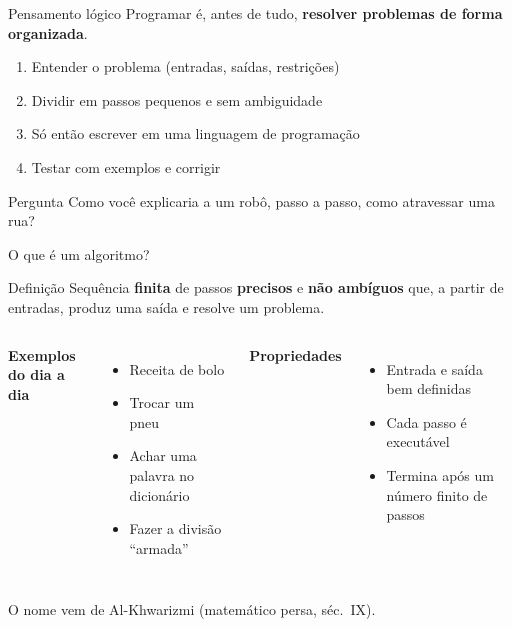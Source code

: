 \documentclass[aspectratio=169,10pt,t]{beamer}
\begin{document}
\begin{frame}{Pensamento lógico}
  Programar é, antes de tudo, \textbf{resolver problemas de forma organizada}.
  \vspace{1ex}
  \begin{enumerate}
    \item Entender o problema (entradas, saídas, restrições)
    \item Dividir em passos pequenos e sem ambiguidade
    \item Só então escrever em uma linguagem de programação
    \item Testar com exemplos e corrigir
  \end{enumerate}
  \vspace{1ex}
  \begin{exampleblock}{Pergunta}
    Como você explicaria a um robô, passo a passo, como atravessar uma rua?
  \end{exampleblock}
\end{frame}

\begin{frame}{O que é um algoritmo?}
  \begin{block}{Definição}
    Sequência \textbf{finita} de passos \textbf{precisos} e \textbf{não ambíguos} que, a partir de entradas, produz uma saída e resolve um problema.
  \end{block}
  \begin{columns}[T]
    \textbf{Exemplos do dia a dia}
    \begin{itemize}
      \item Receita de bolo
      \item Trocar um pneu
      \item Achar uma palavra no dicionário
      \item Fazer a divisão ``armada''
    \end{itemize}
    \textbf{Propriedades}
    \begin{itemize}
      \item Entrada e saída bem definidas
      \item Cada passo é executável
      \item Termina após um número finito de passos
    \end{itemize}
  \end{columns}
  \vfill
  {\footnotesize O nome vem de Al-Khwarizmi (matemático persa, séc.~IX).}
\end{frame}
\end{document}
